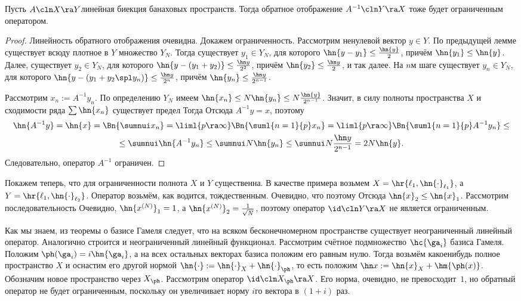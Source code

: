 \documentclass[a4paper]{article}
\begin{document}
\begin{theorem}
Пусть $A\cln X \ra Y$\т линейная биекция банаховых пространств.
Тогда обратное отображение $A^{-1}\cln Y \ra X$ тоже будет ограниченным оператором.
\end{theorem}
\begin{proof}
Линейность обратного отображения очевидна. Докажем ограниченность.
Рассмотрим ненулевой вектор $y \in Y$. По предыдущей лемме существует всюду плотное в $Y$ множество $Y_N$.
Тогда существует $y_1 \in Y_N$, для которого $\hn{y- y_1} \le \frac{\hn{y}}{2}$, причём $\hn{y_1} \le \hn{y}$.
Далее, существует $y_2 \in Y_N$, для которого $\hn{y-(y_1+y_2)}\le\frac{\hn y}{2^2}$, причём
$\hn{y_2} \le\frac{\hn y}{2}$, и так далее.
На $n$\д м шаге существует $y_n \in Y_N$, для которого
$\hn{y-(y_1+y_2\spl y_n)}\le\frac{\hn y}{2^n}$, причём
$\hn{y_n} \le\frac{\hn y}{2^{n-1}}$.

Рассмотрим $x_n := A^{-1}y_n$. По определению $Y_N$ имеем
$\hn{x_n} \le N\hn{y_n} \le N\frac{\hn{y}}{2^{n-1}}$.
Значит, в силу полноты пространства $X$ и сходимости ряда $\sum \hn{x_n}$ существует предел
Тогда
Отсюда $A^{-1}y=x$, поэтому
\begin{multline*}
  \hn{A^{-1}y}=\hn{x} = \Bn{\sumnui x_n} = \liml{p\ra\infty}\Bn{\suml{n=1}{p}x_n} =
  \liml{p\ra\infty}\Bn{\suml{n=1}{p}A^{-1}y_n} \le \\ \le\sumnui\hn{A^{-1}y_n} \le
  \sumnui N\hn{y_n} \le \sumnui N \frac{\hn y}{2^{n-1}} = 2N\hn{y}.
\end{multline*}
Следовательно, оператор $A^{-1}$ ограничен.
\end{proof}

Покажем теперь, что для ограниченности полнота $X$ и $Y$ существенна. В качестве примера
возьмем $X = \hr{\ell_1, \hn{\cdot}_{\ell_1}}$,
а $Y = \hr{\ell_1, \hn{\cdot}_{\ell_2}}$. Оператор возьмём, как водится, тождественным. Очевидно, что
поэтому
Отсюда $\hn{x}_2 \le \hn{x}_1$. Рассмотрим последовательность
Очевидно, $\hn{x^{(N)}}_1 = 1$, а $\hn{x^{(N)}}_2 = \frac{1}{\sqrt N}$, поэтому
оператор $\id\cln Y \ra X$ не является ограниченным.

Как мы знаем, из теоремы о базисе Гамеля следует, что на всяком бесконечномерном пространстве
существует неограниченный линейный оператор. Аналогично строится и неограниченный линейный функционал.
Рассмотрим счётное подмножество $\hc{\ga_i}$ базиса Гамеля. Положим $\ph(\ga_i) = i\hn{\ga_i}$, а на
всех остальных векторах базиса положим его
равным нулю. Тогда возьмём какое\д нибудь полное пространство $X$ и оснастим его другой
нормой $\hn{\cdot} := \hn{\cdot}_X + \hn{\cdot}_\ph$, то есть
положим $\hn x := \hn{x}_X + \hm{\ph(x)}$. Обозначим новое пространство через $X_\ph$.
Рассмотрим оператор $\id\cln X_\ph \ra X$. Его норма, очевидно, не превосходит~$1$,
но обратный оператор не будет ограниченным, поскольку он увеличивает норму $i$\д го вектора
в $(1+i)$ раз.
\end{document}
